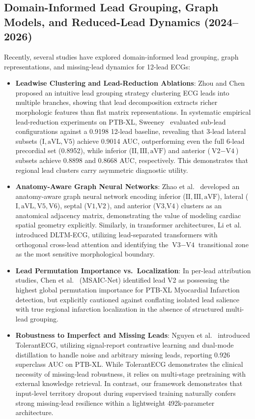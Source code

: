 \documentclass[12pt]{elsarticle}
\begin{document}
\subsection{Domain-Informed Lead Grouping, Graph Models, and Reduced-Lead Dynamics (2024--2026)}
Recently, several studies have explored domain-informed lead grouping, graph representations, and missing-lead dynamics for 12-lead ECGs:
\begin{itemize}
    \item \textbf{Leadwise Clustering and Lead-Reduction Ablations}: Zhou and Chen~\cite{zhou2024leadwise} proposed an intuitive lead grouping strategy clustering ECG leads into multiple branches, showing that lead decomposition extracts richer morphologic features than flat matrix representations. In systematic empirical lead-reduction experiments on PTB-XL, Sweeney~\cite{sweeney2024lead} evaluated sub-lead configurations against a 0.9198 12-lead baseline, revealing that 3-lead lateral subsets ($\text{I}, \text{aVL}, \text{V5}$) achieve 0.9014 AUC, outperforming even the full 6-lead precordial set (0.8952), while inferior ($\text{II}, \text{III}, \text{aVF}$) and anterior ($\text{V2}-\text{V4}$) subsets achieve 0.8898 and 0.8668 AUC, respectively. This demonstrates that regional lead clusters carry asymmetric diagnostic utility.
    \item \textbf{Anatomy-Aware Graph Neural Networks}: Zhao et al.~\cite{anat_graph2026} developed an anatomy-aware graph neural network encoding inferior ($\text{II}, \text{III}, \text{aVF}$), lateral ($\text{I}, \text{aVL}, \text{V5}, \text{V6}$), septal ($\text{V1}, \text{V2}$), and anterior ($\text{V3}, \text{V4}$) clusters as an anatomical adjacency matrix, demonstrating the value of modeling cardiac spatial geometry explicitly. Similarly, in transformer architectures, Li et al.~\cite{dltm_ecg2026} introduced DLTM-ECG, utilizing lead-separated transformers with orthogonal cross-lead attention and identifying the $\text{V3}-\text{V4}$ transitional zone as the most sensitive morphological boundary.
    \item \textbf{Lead Permutation Importance vs.\ Localization}: In per-lead attribution studies, Chen et al.~\cite{msaicnet2026} (MSAIC-Net) identified lead V2 as possessing the highest global permutation importance for PTB-XL Myocardial Infarction detection, but explicitly cautioned against conflating isolated lead salience with true regional infarction localization in the absence of structured multi-lead grouping.
    \item \textbf{Robustness to Imperfect and Missing Leads}: Nguyen et al.~\cite{nguyen2025tolerantecg} introduced TolerantECG, utilizing signal-report contrastive learning and dual-mode distillation to handle noise and arbitrary missing leads, reporting 0.926 superclass AUC on PTB-XL. While TolerantECG demonstrates the clinical necessity of missing-lead robustness, it relies on multi-stage pretraining with external knowledge retrieval. In contrast, our framework demonstrates that input-level territory dropout during supervised training naturally confers strong missing-lead resilience within a lightweight 492k-parameter architecture.

\end{itemize}
\end{document}
